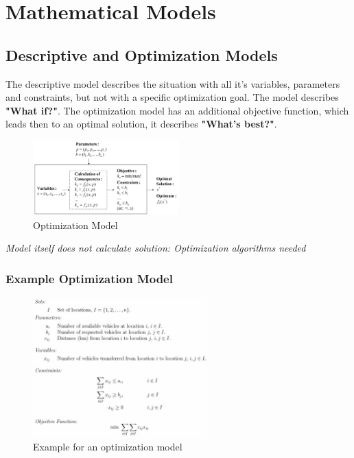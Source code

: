 \section{Mathematical Models}
\subsection{Descriptive and Optimization Models}

The descriptive model describes the situation with all it's variables, parameters and constraints, but not with a specific optimization goal. The model describes \textbf{"What if?"}. The optimization model has an additional objective function, which leads then to an optimal solution, it describes \textbf{"What's best?"}.

\begin{figure}[H]
\centering
\includegraphics[width=0.5\textwidth]{figures/optimization_model.png}
\caption{Optimization Model}
\end{figure}

\textit{Model itself does not calculate solution: Optimization algorithms needed}

\subsubsection{Example Optimization Model}

\begin{figure}[H]
\centering
\includegraphics[width=0.6\textwidth]{figures/example_optimization_model.png}
\caption{Example for an optimization model}
\end{figure}


